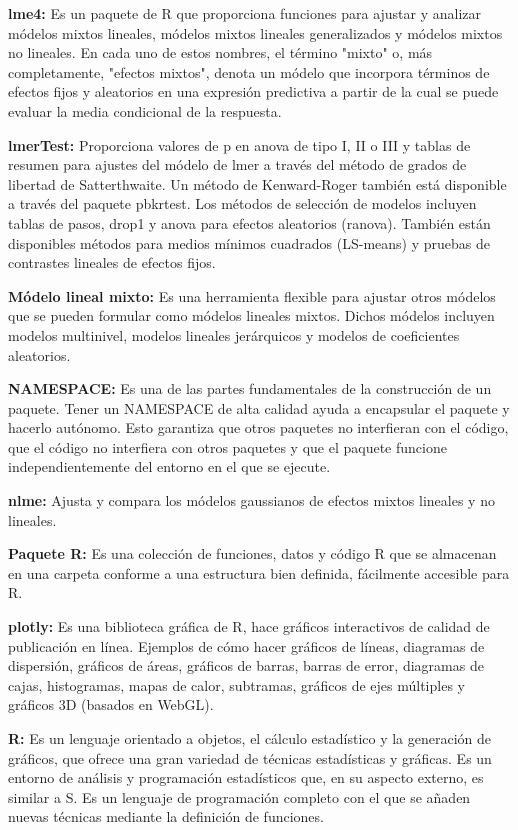 \textbf{lme4: } Es un paquete de R que proporciona funciones para ajustar y analizar m\'odelos mixtos lineales, m\'odelos mixtos lineales generalizados y m\'odelos mixtos no lineales. En cada uno de estos nombres, el t\'ermino "mixto" o, m\'as completamente, "efectos mixtos", denota un m\'odelo que incorpora t\'erminos de efectos fijos y aleatorios en una expresi\'on predictiva a partir de la cual se puede evaluar la media condicional de la respuesta. 

\textbf{lmerTest: } Proporciona valores de p en anova de tipo I, II o III y tablas de resumen para ajustes del m\'odelo de lmer a trav\'es del m\'etodo de grados de libertad de Satterthwaite. Un m\'etodo de Kenward-Roger tambi\'en est\'a disponible a trav\'es del paquete pbkrtest. Los m\'etodos de selecci\'on de modelos incluyen tablas de pasos, drop1 y anova para efectos aleatorios (ranova). Tambi\'en están disponibles m\'etodos para medios m\'inimos cuadrados (LS-means) y pruebas de contrastes lineales de efectos fijos.

\textbf{M\'odelo lineal mixto: } Es una herramienta flexible para ajustar otros m\'odelos que se pueden formular como m\'odelos lineales mixtos. Dichos m\'odelos incluyen modelos multinivel, modelos lineales jer\'arquicos y modelos de coeficientes aleatorios.

\textbf{NAMESPACE: } Es una de las partes fundamentales de la construcci\'on de un paquete. Tener un NAMESPACE de alta calidad ayuda a encapsular el paquete y hacerlo aut\'onomo. Esto garantiza que otros paquetes no interfieran con el c\'odigo, que el c\'odigo no interfiera con otros paquetes y que el paquete funcione independientemente del entorno en el que se ejecute.

\textbf{nlme: } Ajusta y compara los m\'odelos gaussianos de efectos mixtos lineales y no lineales.

\textbf{Paquete R: } Es una colecci\'on de funciones, datos y c\'odigo R que se almacenan en una carpeta conforme a una estructura bien definida, f\'acilmente accesible para R.

\textbf{plotly: } Es una biblioteca gr\'afica de R, hace gr\'aficos interactivos de calidad de publicaci\'on en l\'inea. Ejemplos de c\'omo hacer gr\'aficos de l\'ineas, diagramas de dispersi\'on, gr\'aficos de \'areas, gr\'aficos de barras, barras de error, diagramas de cajas, histogramas, mapas de calor, subtramas, gr\'aficos de ejes m\'ultiples y gr\'aficos 3D (basados en WebGL).

\textbf{R: } Es un lenguaje orientado a objetos, el c\'alculo estad\'istico y la generaci\'on de gr\'aficos, que ofrece una gran variedad de t\'ecnicas estad\'isticas y gr\'aficas. Es un entorno de an\'alisis y programaci\'on estad\'isticos que, en su aspecto externo, es similar a S. Es un lenguaje de programaci\'on completo con el que se añaden nuevas t\'ecnicas mediante la definici\'on de funciones.

